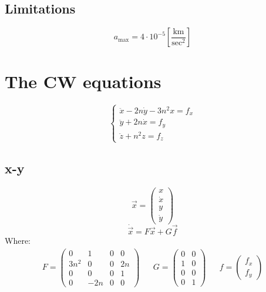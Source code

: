 \documentclass[11pt, a4paper]{article}
\begin{document}
\subsection{Limitations}
\begin{equation*}
    a_\text{max} = 4\cdot10^{-5}\left[\frac{\mathrm{km}}{\mathrm{sec}^2}\right]
\end{equation*}

\section{The CW equations}
\begin{equation}
    \left\{\begin{array}{l}
        \ddot{x}-2n\dot{y}-3n^2x=f_x\\
        \ddot{y}+2n\dot{x}=f_y\\
        \ddot{z}+n^2z=f_z
    \end{array}\right.
\end{equation}

\subsection{x-y}
\begin{equation}
    \vec{x}=\begin{pmatrix}
        x\\\dot{x}\\y\\\dot{y}
    \end{pmatrix}
\end{equation}
\begin{equation}
    \dot{\vec{x}}=F\vec{x}+G\vec{f}
\end{equation}
Where:
\begin{equation}
    \begin{matrix}
        F=\begin{pmatrix}
            0 & 1 & 0 & 0 \\
            3n^2 & 0 & 0 & 2n \\
            0 & 0 & 0 & 1 \\
            0 & -2n & 0 & 0
        \end{pmatrix} && G=\begin{pmatrix}
            0 & 0\\
            1 & 0\\
            0 & 0\\
            0 & 1
        \end{pmatrix} && f=\begin{pmatrix}
            f_x\\f_y
        \end{pmatrix}
    \end{matrix}
\end{equation}
\end{document}
